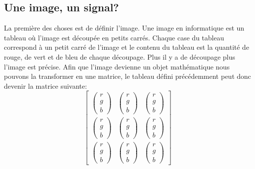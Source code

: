 \documentclass[a4paper,12pt,titlepage]{report}
\begin{document}
		\subsection{Une image, un signal?}	
		La première des choses est de définir l'image. Une image en informatique est un tableau où l'image est découpée en petits carrés. Chaque case du tableau correspond à un petit carré de l'image et le contenu du tableau est la quantité de rouge, de vert et de bleu de chaque découpage. Plus il y a de découpage plus l'image est précise.
		Afin que l'image devienne un objet mathématique nous pouvons la transformer en une matrice, le tableau défini précédemment peut donc devenir la matrice suivante:
		\begin{equation}
		\begin{bmatrix} 
		\begin{pmatrix} r \\ g\\ b \end{pmatrix} &\begin{pmatrix} r \\ g\\ b \end{pmatrix}&\begin{pmatrix} r \\ g\\ b \end{pmatrix} 
		\\ \begin{pmatrix} r \\ g\\ b \end{pmatrix} & \begin{pmatrix} r \\ g\\ b \end{pmatrix}&\begin{pmatrix} r \\ g\\ b \end{pmatrix}
		\\ \begin{pmatrix} r \\ g\\ b \end{pmatrix} & \begin{pmatrix} r \\ g\\ b \end{pmatrix}&\begin{pmatrix} r \\ g\\ b \end{pmatrix} 
		\end{bmatrix}
		\end{equation}
\end{document}
